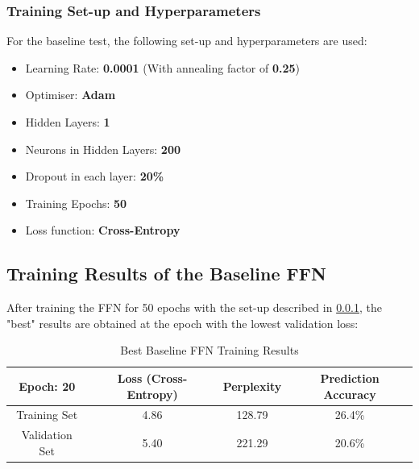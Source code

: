 \documentclass[sigconf,nonacm=true]{acmart}
\begin{document}
\subsubsection{Training Set-up and Hyperparameters} \label{subsubsection:baselinesetup}
For the baseline test, the following set-up and hyperparameters are used:
\begin{itemize}
	\item Learning Rate: \textbf{0.0001} (With annealing factor of \textbf{0.25})
	\item Optimiser: \textbf{Adam}
	\item Hidden Layers: \textbf{1}
	\item Neurons in Hidden Layers: \textbf{200}
	\item Dropout in each layer: \textbf{20\%}
	\item Training Epochs: \textbf{50}
	\item Loss function: \textbf{Cross-Entropy}
\end{itemize}

\subsection{Training Results of the Baseline FFN}
\label{subsection:baselineresults}
After training the FFN for 50 epochs with the set-up described in 
\ref{subsubsection:baselinesetup}, the "best" results are obtained at the epoch
with the lowest validation loss:  

\begin{table}[H]
	\label{tab:freq}
	\begin{adjustbox}{width=\columnwidth}
	\begin{tabular}{cccc}
		\toprule
		Epoch: 20&Loss (Cross-Entropy)&Perplexity&Prediction Accuracy\\
		\midrule
		Training Set & 4.86 & 128.79 & 26.4\% \\
		Validation Set & 5.40 & 221.29 & 20.6\% \\
		\bottomrule
	\end{tabular}
	\end{adjustbox}
	\caption{Best Baseline FFN Training Results}
\end{table}
\end{document}
